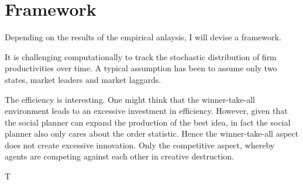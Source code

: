 \documentclass[12pt,english]{article}
\theoremstyle{remark}
\begin{document}
\section{Framework}

Depending on the results of the empirical anlaysis, I will devise a framework.

It is challenging computationally to track the stochastic distribution of firm productivities over time. A typical assumption has been to assume only two states, market leaders and market laggards. 



The efficiency is interesting. One might think that the winner-take-all environment leads to an excessive investment in efficiency. However, given that the social planner can expand the production of the best idea, in fact the social planner also only cares about the order statistic. Hence the winner-take-all aspect does not create excessive innovation. Only the competitive aspect, whereby agents are competing against each other in creative destruction.

T





\end{document}
